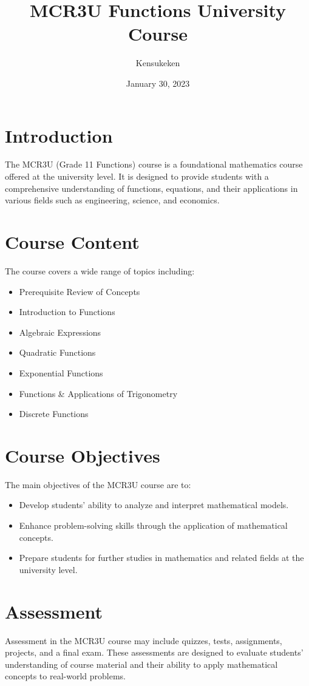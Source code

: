 \documentclass{article}
\title{MCR3U Functions University Course}
\author{Kensukeken}
\date{January 30, 2023}
\begin{document}
\maketitle

\section{Introduction}
The MCR3U (Grade 11 Functions) course is a foundational mathematics course offered at the university level. It is designed to provide students with a comprehensive understanding of functions, equations, and their applications in various fields such as engineering, science, and economics.

\section{Course Content}
The course covers a wide range of topics including:
\begin{itemize}
    \item Prerequisite Review of Concepts
    \item Introduction to Functions
    \item Algebraic Expressions
    \item Quadratic Functions
    \item Exponential Functions
    \item Functions \& Applications of Trigonometry
    \item Discrete Functions
\end{itemize}

\section{Course Objectives}
The main objectives of the MCR3U course are to:
\begin{itemize}
    \item Develop students' ability to analyze and interpret mathematical models.
    \item Enhance problem-solving skills through the application of mathematical concepts.
    \item Prepare students for further studies in mathematics and related fields at the university level.
\end{itemize}

\section{Assessment}
Assessment in the MCR3U course may include quizzes, tests, assignments, projects, and a final exam. These assessments are designed to evaluate students' understanding of course material and their ability to apply mathematical concepts to real-world problems.
\end{document}
